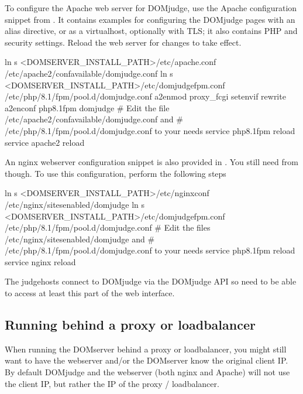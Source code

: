 \documentclass[a4paper,10pt,english,openany]{sphinxmanual}
\begin{document}
\sphinxAtStartPar
To configure the Apache web server for DOMjudge, use the Apache
configuration snippet from . It contains
examples for configuring the DOMjudge pages with an alias directive,
or as a virtualhost, optionally with TLS; it also contains PHP and security
settings. Reload the web server for changes to take effect.
\begin{sphinxalltt}
ln \sphinxhyphen{}s \textless{}DOMSERVER\_INSTALL\_PATH\textgreater{}/etc/apache.conf /etc/apache2/conf\sphinxhyphen{}available/domjudge.conf
ln \sphinxhyphen{}s \textless{}DOMSERVER\_INSTALL\_PATH\textgreater{}/etc/domjudge\sphinxhyphen{}fpm.conf /etc/php/8.1/fpm/pool.d/domjudge.conf
a2enmod proxy\_fcgi setenvif rewrite
a2enconf php8.1\sphinxhyphen{}fpm domjudge
\# Edit the file /etc/apache2/conf\sphinxhyphen{}available/domjudge.conf and
\# /etc/php/8.1/fpm/pool.d/domjudge.conf to your needs
service php8.1\sphinxhyphen{}fpm reload
service apache2 reload
\end{sphinxalltt}

\sphinxAtStartPar
An nginx webserver configuration snippet is also provided in
.  You still need  from 
though. To use this configuration, perform the following steps
\begin{sphinxalltt}
ln \sphinxhyphen{}s \textless{}DOMSERVER\_INSTALL\_PATH\textgreater{}/etc/nginx\sphinxhyphen{}conf /etc/nginx/sites\sphinxhyphen{}enabled/domjudge
ln \sphinxhyphen{}s \textless{}DOMSERVER\_INSTALL\_PATH\textgreater{}/etc/domjudge\sphinxhyphen{}fpm.conf /etc/php/8.1/fpm/pool.d/domjudge.conf
\# Edit the files /etc/nginx/sites\sphinxhyphen{}enabled/domjudge and
\# /etc/php/8.1/fpm/pool.d/domjudge.conf to your needs
service php8.1\sphinxhyphen{}fpm reload
service nginx reload
\end{sphinxalltt}

\sphinxAtStartPar
The judgehosts connect to DOMjudge via the DOMjudge API so need
to be able to access at least this part of the web interface.


\subsection{Running behind a proxy or loadbalancer}
\label{\detokenize{install-domserver:running-behind-a-proxy-or-loadbalancer}}
\sphinxAtStartPar
When running the DOMserver behind a proxy or loadbalancer, you might still want
to have the webserver and/or the DOMserver know the original client IP. By
default DOMjudge and the webserver (both nginx and Apache) will not use the
client IP, but rather the IP of the proxy / loadbalancer.
\end{document}
